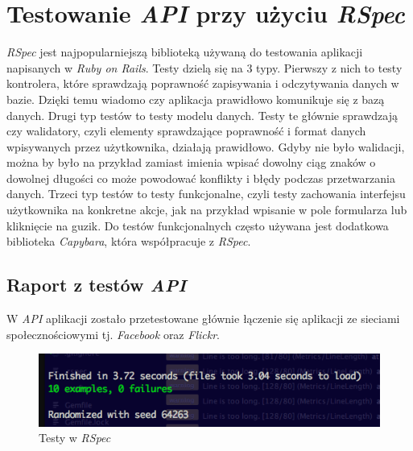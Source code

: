 \documentclass[openright]{xmgr}
\begin{document}
\section{Testowanie \textit{API} przy użyciu \textit{RSpec}}
\textit{RSpec} jest najpopularniejszą biblioteką używaną do testowania aplikacji napisanych w \textit{Ruby on Rails}. Testy dzielą się na 3 typy. Pierwszy z nich to testy kontrolera, które sprawdzają poprawność zapisywania i odczytywania danych w bazie. Dzięki temu wiadomo czy aplikacja prawidłowo komunikuje się z bazą danych. Drugi typ testów to testy modelu danych. Testy te głównie sprawdzają czy walidatory, czyli elementy sprawdzające poprawność i format danych wpisywanych przez użytkownika, działają prawidłowo. Gdyby nie było walidacji, można by było na przykład zamiast imienia wpisać dowolny ciąg znaków o dowolnej długości co może powodować konflikty i błędy podczas przetwarzania danych. Trzeci typ testów to testy funkcjonalne, czyli testy zachowania interfejsu użytkownika na konkretne akcje, jak na przykład wpisanie w pole formularza lub kliknięcie na guzik. Do testów funkcjonalnych często używana jest dodatkowa biblioteka \textit{Capybara}, która współpracuje z \textit{RSpec}. 

\subsection{Raport z testów \textit{API}}
W \textit{API} aplikacji zostało przetestowane głównie łączenie się aplikacji ze sieciami społecznościowymi tj. \textit{Facebook} oraz \textit{Flickr}. \begin{figure}[H]
\centering
\includegraphics[width=1\hsize]{images/rails_testy.png}
\caption{Testy w \textit{RSpec}\label{RYS.1}}
\end{figure}
\end{document}
